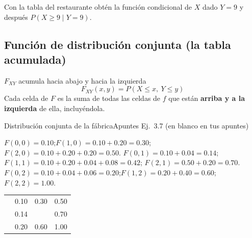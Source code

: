 \begin{turno}
Con la tabla del restaurante obt\'en la funci\'on condicional de $X$ dado $Y=9$ y despu\'es $P(X\ge9\mid Y=9)$.
\end{turno}

\subsection{Funci\'on de distribuci\'on conjunta (la tabla acumulada)}

\begin{idea}{$F_{XY}$ acumula hacia abajo y hacia la izquierda}
\[F_{XY}(x,y)=P(X\le x,\ Y\le y)\]
Cada celda de $F$ es la suma de todas las celdas de $f$ que est\'an \textbf{arriba y a la izquierda} de ella, incluy\'endola.
\end{idea}

\begin{resuelto}{Distribuci\'on conjunta de la f\'abrica}{Apuntes \textbullet{} Ej.~3.7 (en blanco en tus apuntes)}
\begin{pasos}
$F(0,0)=0.10$;\quad $F(1,0)=0.10+0.20=0.30$;\quad $F(2,0)=0.10+0.20+0.20=0.50$.
$F(0,1)=0.10+0.04=0.14$;\quad $F(1,1)=0.10+0.20+0.04+0.08=0.42$;\quad
$F(2,1)=0.50+0.20=0.70$.
$F(0,2)=0.10+0.04+0.06=0.20$;\quad $F(1,2)=0.20+0.40=0.60$;\quad $F(2,2)=1.00$.
\begin{center}
\begin{tabular}{|C|C|C|C|}\hline
{} &  &  & \\\hline
{} & 0.10 & 0.30 & 0.50\\\hline
{} & 0.14 &  & 0.70\\\hline
{} & 0.20 & 0.60 & 1.00\\\hline
\end{tabular}
\end{center}
\end{pasos}
\end{resuelto}

